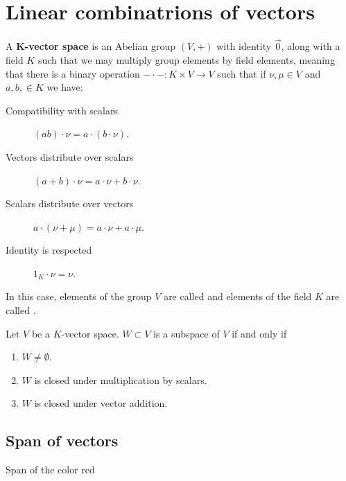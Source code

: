 \documentclass{ximera}
\begin{document}
\section{Linear combinatrions of vectors}

\begin{definition}
  A \textbf{$\boldsymbol{K}$-vector space} is an Abelian group $(V,+)$
  with identity $\vec{0}$, along with a field $K$ such that we may
  multiply group elements by field elements, meaning that there is a
  binary operation $-\cdot-: K\times V \to V$ such that if $\nu,\mu\in
  V$ and $a,b,\in K$ we have:
\begin{description}
\item[Compatibility with scalars] $(ab)\cdot \nu = a\cdot (b\cdot \nu)$.
\item[Vectors distribute over scalars] $(a+b)\cdot \nu =
  a\cdot\nu + b\cdot \nu$.
\item[Scalars distribute over vectors] $a\cdot (\nu+\mu) =
  a\cdot \nu + a\cdot \mu$.
\item[Identity is respected] $1_K\cdot \nu = \nu$.
\end{description}
In this case, elements of the group $V$ are called  and
elements of the field $K$ are called .
\end{definition}

\begin{lemma}
  Let $V$ be a $K$-vector space. $W\subset V$ is a subspace of $V$ if
  and only if
  \begin{enumerate}
  \item $W\ne \emptyset$.
  \item $W$ is closed under multiplication by scalars.
  \item $W$ is closed under vector addition.
  \end{enumerate}
\end{lemma}

\subsection{Span of vectors}

Span of the color red

\begin{center}
\end{center}
\end{document}
